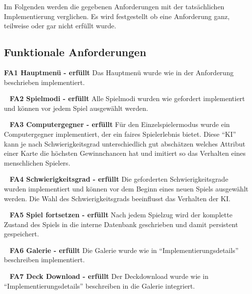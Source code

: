 \documentclass{scrartcl}
\begin{document}
Im Folgenden werden die gegebenen Anforderungen mit der tatsächlichen
Implementierung verglichen. Es wird festgestellt ob eine Anforderung ganz,
teilweise oder gar nicht erfüllt wurde.

\subsection{Funktionale Anforderungen}

\textbf{FA1 Hauptmenü - erfüllt} \newline
Das Hauptmenü wurde wie in der Anforderung beschrieben implementiert.

\ \newline
\textbf{FA2 Spielmodi - erfüllt} \newline
Alle Spielmodi wurden wie gefordert implementiert und können vor jedem Spiel
ausgewählt werden.

\ \newline
\textbf{FA3 Computergegner - erfüllt} \newline
Für den Einzelspielermodus wurde ein Computergegner implementiert, der ein
faires Spielerlebnis bietet. Diese \enquote{KI} kann je nach Schwierigkeitsgrad
unterschiedlich gut abschätzen welches Attribut einer Karte die höchsten
Gewinnchancen hat und imitiert so das Verhalten eines menschlichen Spielers.

\ \newline
\textbf{FA4 Schwierigkeitsgrad - erfüllt} \newline
Die geforderten Schwierigkeitsgrade wurden implementiert und können vor dem
Beginn eines neuen Spiels ausgewählt werden. Die Wahl des Schwierigkeitsgrads
beeinflusst das Verhalten der KI.

\ \newline
\textbf{FA5 Spiel fortsetzen - erfüllt} \newline
Nach jedem Spielzug wird der komplette Zustand des Spiels in die interne
Datenbank geschrieben und damit persistent gespeichert.

\ \newline
\textbf{FA6 Galerie - erfüllt} \newline
Die Galerie wurde wie in \enquote{Implementierungsdetails} beschreiben
implementiert.

\ \newline
\textbf{FA7 Deck Download - erfüllt} \newline
Der Deckdownload wurde wie in \enquote{Implementierungsdetails} beschreiben in
die Galerie integriert.
\end{document}
